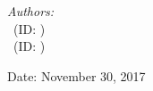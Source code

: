 \begin{titlepage}
\begin{flushleft} \large
\textit{Authors:}\\
\reportauthorOne~(ID: \cidOne)\\ %
\reportauthorTwo~(ID: \cidTwo) %
\end{flushleft}
\vspace{4cm}
\makeatletter
Date: November 30, 2017

\vfill %



\makeatother


\end{titlepage}

